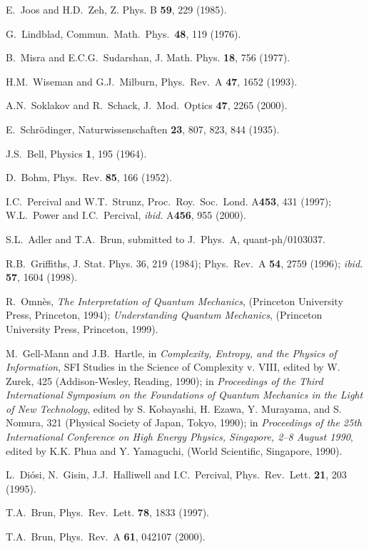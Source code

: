 \documentclass[12pt]{article}
\begin{document}
\begin{thebibliography}{99}
  E.~Joos and H.D.~Zeh, Z. Phys. B {\bf 59}, 229 (1985).

 G.~Lindblad, Commun.~Math.~Phys.~{\bf 48}, 119 (1976).

  B.~Misra and E.C.G.~Sudarshan, J. Math. Phys. {\bf 18},
  756 (1977).

 H.M.~Wiseman and G.J.~Milburn, Phys.~Rev.~A {\bf 47},
1652 (1993).

 A.N.~Soklakov and R.~Schack, J.~Mod.~Optics {\bf 47},
  2265 (2000).

 E.~Schr\"odinger, Naturwissenschaften {\bf 23},
807, 823, 844 (1935).

 J.S.~Bell, Physics {\bf 1}, 195 (1964).

 D.~Bohm, Phys.~Rev. {\bf 85}, 166 (1952).

 I.C.~Percival and W.T.~Strunz,
Proc.~Roy.~Soc.~Lond. A{\bf 453}, 431 (1997);
W.L.~Power and I.C.~Percival, {\it ibid.\/} A{\bf 456}, 955 (2000).

 S.L.~Adler and T.A.~Brun, submitted to J.~Phys.~A,
quant-ph/0103037.

 R.B.~Griffiths, J. Stat. Phys. 36, 219 (1984);
Phys.~Rev.~A {\bf 54}, 2759 (1996); {\it ibid.\/} {\bf 57}, 1604 (1998).

 R.~Omn\`es, {\sl The Interpretation of Quantum Mechanics},
(Princeton University Press, Princeton, 1994);
{\sl Understanding Quantum Mechanics},
(Princeton University Press, Princeton, 1999).

 M.~Gell-Mann and J.B.~Hartle, in {\sl Complexity, Entropy,
and the Physics of Information},
SFI Studies in the Science of Complexity v. VIII,
edited by W. Zurek, 425 (Addison-Wesley, Reading, 1990);
in {\sl Proceedings of the Third International Symposium on the Foundations
of Quantum Mechanics in the Light of New Technology},
edited by S. Kobayashi, H. Ezawa, Y. Murayama, and S. Nomura, 321
(Physical Society of Japan, Tokyo, 1990);
in {\sl Proceedings of the 25th International
Conference on High Energy Physics, Singapore, 2--8 August 1990},
edited by K.K. Phua and Y. Yamaguchi, (World Scientific, Singapore, 1990).

 L.~Di\'osi, N.~Gisin, J.J.~Halliwell and I.C.~Percival,
Phys.~Rev.~Lett. {\bf 21}, 203 (1995).

 T.A.~Brun, Phys.~Rev.~Lett. {\bf 78}, 1833 (1997).

 T.A.~Brun, Phys.~Rev.~A {\bf 61}, 042107 (2000).

\end{thebibliography}
\end{document}
